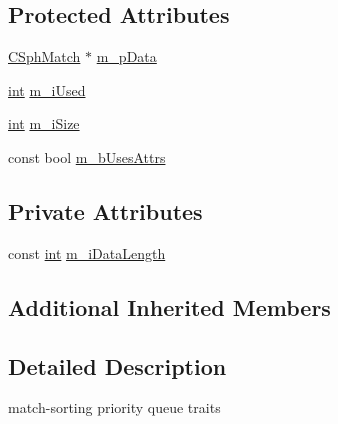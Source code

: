 \subsection*{Protected Attributes}
\begin{DoxyCompactItemize}
\item 
\hyperlink{classCSphMatch}{C\-Sph\-Match} $\ast$ \hyperlink{classCSphMatchQueueTraits_a2fe4eba7fda1aebb934e4651c08b4f65}{m\-\_\-p\-Data}
\item 
\hyperlink{sphinxexpr_8cpp_a4a26e8f9cb8b736e0c4cbf4d16de985e}{int} \hyperlink{classCSphMatchQueueTraits_a79d40a751ae08d2693fbf52c8444b4c2}{m\-\_\-i\-Used}
\item 
\hyperlink{sphinxexpr_8cpp_a4a26e8f9cb8b736e0c4cbf4d16de985e}{int} \hyperlink{classCSphMatchQueueTraits_a162ecbce6bdcc3b700835548b8e1a437}{m\-\_\-i\-Size}
\item 
const bool \hyperlink{classCSphMatchQueueTraits_ae1b172fd47189997ff938ef9d6228752}{m\-\_\-b\-Uses\-Attrs}
\end{DoxyCompactItemize}
\subsection*{Private Attributes}
\begin{DoxyCompactItemize}
\item 
const \hyperlink{sphinxexpr_8cpp_a4a26e8f9cb8b736e0c4cbf4d16de985e}{int} \hyperlink{classCSphMatchQueueTraits_a9b091659866defd25f33ba9cacd447f1}{m\-\_\-i\-Data\-Length}
\end{DoxyCompactItemize}
\subsection*{Additional Inherited Members}


\subsection{Detailed Description}
match-\/sorting priority queue traits 

